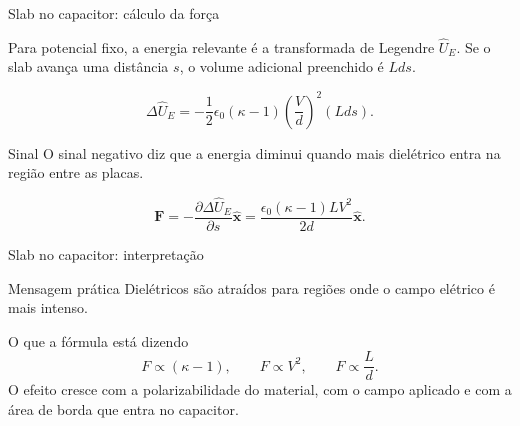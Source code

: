 \documentclass[aspectratio=169]{beamer}
\begin{document}
\begin{frame}{Slab no capacitor: cálculo da força}

\small

Para potencial fixo, a energia relevante é a transformada de Legendre
\(\widehat U_E\). Se o slab avança uma distância \(s\), o volume adicional
preenchido é \(Lds\).

\[
\Delta\widehat U_E
=
-\frac12\epsilon_0(\kappa-1)
\left(\frac{V}{d}\right)^2(Lds).
\]

\begin{mybox}{Sinal}
O sinal negativo diz que a energia diminui quando mais dielétrico entra na
região entre as placas.
\end{mybox}

\begin{eqbox}
\[
\mathbf F
=
-\frac{\partial\Delta\widehat U_E}{\partial s}\hat{\mathbf x}
=
\frac{\epsilon_0(\kappa-1)LV^2}{2d}\hat{\mathbf x}.
\]
\end{eqbox}

\end{frame}

\begin{frame}{Slab no capacitor: interpretação}

\small

\begin{alertblock}{Mensagem prática}
Dielétricos são atraídos para regiões onde o campo elétrico é mais intenso.
\end{alertblock}

\begin{mybox}{O que a fórmula está dizendo}
\[
F\propto(\kappa-1),
\qquad
F\propto V^2,
\qquad
F\propto \frac{L}{d}.
\]
O efeito cresce com a polarizabilidade do material, com o campo aplicado e com a
área de borda que entra no capacitor.
\end{mybox}

\end{frame}
\end{document}
